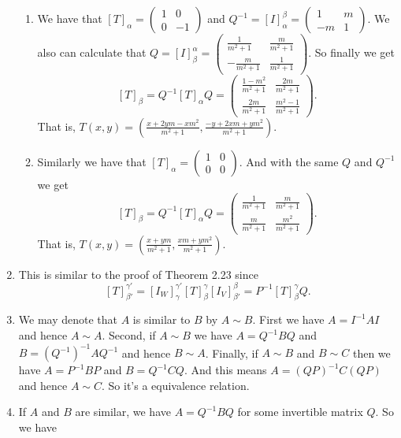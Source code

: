 \begin{enumerate}
\begin{enumerate}
\item We have that $[T]_{\alpha}=\left(\begin{array}{cc}1&0\\0&-1\end{array}\right)$ and $Q^{-1}=[I]_{\alpha}^{\beta}=\left(\begin{array}{cc}1&m\\-m&1\end{array}\right)$. We also can calculate that $Q=[I]_{\beta}^{\alpha}=\left(\begin{array}{cc}\frac{1}{m^2+1}&\frac{m}{m^2+1}\\-\frac{m}{m^2+1}&\frac{1}{m^2+1}\end{array}\right)$. So finally we get 
\[[T]_{\beta}=Q^{-1}[T]_{\alpha}Q=\left(\begin{array}{cc}\frac{1-m^2}{m^2+1}&\frac{2m}{m^2+1}\\\frac{2m}{m^2+1}&\frac{m^2-1}{m^2+1}\end{array}\right).\]
That is, $T(x,y)=(\frac{x+2ym-xm^2}{m^2+1},\frac{-y+2xm+ym^2}{m^2+1})$.
\item Similarly we have that $[T]_{\alpha}=\left(\begin{array}{cc}1&0\\0&0\end{array}\right)$. And with the same $Q$ and $Q^{-1}$ we get 
\[[T]_{\beta}=Q^{-1}[T]_{\alpha}Q=\left(\begin{array}{cc}\frac{1}{m^2+1}&\frac{m}{m^2+1}\\\frac{m}{m^2+1}&\frac{m^2}{m^2+1}\end{array}\right).\]
That is, $T(x,y)=(\frac{x+ym}{m^2+1},\frac{xm+ym^2}{m^2+1})$.
\end{enumerate}
\item This is similar to the proof of Theorem 2.23 since 
\[[T]_{\beta'}^{\gamma'}=[I_W]_{\gamma}^{\gamma'}[T]_{\beta}^{\gamma}[I_V]_{\beta'}^{\beta}=P^{-1}[T]_{\beta}^{\gamma}Q.\]
\item We may denote that $A$ is similar to $B$ by $A\sim B$. First we have $A=I^{-1}AI$ and hence $A\sim A$. Second, if $A\sim B$ we have $A=Q^{-1}BQ$ and $B=(Q^{-1})^{-1}AQ^{-1}$ and hence $B\sim A$. Finally, if $A\sim B$ and $B\sim C$ then we have $A=P^{-1}BP$ and $B=Q^{-1}CQ$. And this means $A=(QP)^{-1}C(QP)$ and hence $A\sim C$. So it's a equivalence relation.
\item If $A$ and $B$ are similar, we have $A=Q^{-1}BQ$ for some invertible matrix $Q$. So we have 

\end{enumerate}
